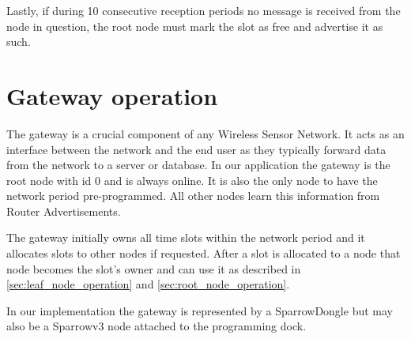 Lastly, if during 10 consecutive reception periods no message is received from
the node in question, the root node must mark the slot as free and advertise it
as such.

\section{Gateway operation}

The gateway is a crucial component of any Wireless Sensor Network. It acts as
an interface between the network and the end user as they typically forward
data from the network to a server or database. In our application the gateway
is the root node with id 0 and is always online. It is also the only node to
have the network period pre-programmed. All other nodes learn this information
from Router Advertisements.

The gateway initially owns all time slots within the network period and it
allocates slots to other nodes if requested. After a slot is allocated to a
node that node becomes the slot's owner and can use it as described in 
\ref{sec:leaf_node_operation} and \ref{sec:root_node_operation}.

In our implementation the gateway is represented by a SparrowDongle but may
also be a Sparrowv3 node attached to the programming dock.

